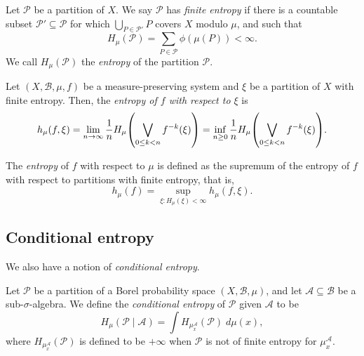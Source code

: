 \documentclass[../main]{subfiles}
\begin{document}
\begin{definition}
  Let \(\mathcal{P}\) be a partition of \(X\). We say \(\mathcal{P}\) has \emph{finite entropy} if there is a countable subset \(\mathcal{P}' \subseteq \mathcal{P}\) for which \(\bigcup_{P \in \mathcal{P}'}P\) covers \(X\) modulo \(\mu\), and such that
  \begin{equation*}
    H_{\mu}(\mathcal{P}) = \sum_{P \in \mathcal{P}} \phi(\mu(P)) < \infty.
  \end{equation*}
  We call \(H_{\mu}(\mathcal{P})\) the \emph{entropy} of the partition \(\mathcal{P}\).
\end{definition}

\begin{definition}
  Let \((X,\mathcal{B},\mu,f)\) be a measure-preserving system and \(\xi\) be a partition of \(X\) with finite entropy. Then, the \emph{entropy of \(f\) with respect to \(\xi\)} is
  \begin{equation*}
    h_{\mu}(f,\xi) =
    \lim_{n \to \infty} \frac{1}{n}H_{\mu}\rpar*{\bigvee_{0 \le k < n}f^{-k}(\xi)} = 
    \inf_{n \ge 0} \frac{1}{n}H_{\mu}\rpar*{\bigvee_{0 \le k < n}f^{-k}(\xi)}.
  \end{equation*}
\end{definition}

\begin{definition}
  The \emph{entropy} of \(f\) with respect to \(\mu\) is defined as the supremum of the entropy of \(f\) with respect to partitions with finite entropy, that is,
  \begin{equation*}
    h_{\mu}(f) = \sup_{\xi \colon H_{\mu}(\xi) < \infty}h_{\mu}(f,\xi).
  \end{equation*}
\end{definition}

\subsection{Conditional entropy}

We also have a notion of \emph{conditional entropy}.

\begin{definition}
  Let \(\mathcal{P}\) be a partition of a Borel probability space \((X,\mathcal{B},\mu)\), and let \(\mathcal{A} \subseteq \mathcal{B}\) be a sub-\(\sigma\)-algebra. We define the \emph{conditional entropy} of \(\mathcal{P}\) given \(\mathcal{A}\) to be
  \begin{equation*}
    H_{\mu}(\mathcal{P}\mid \mathcal{A}) =
    \int H_{\mu^{\mathcal{A}}_x}(\mathcal{P}) \;d\mu(x),
  \end{equation*}
  where \(H_{\mu^{\mathcal{A}}_x}(\mathcal{P})\) is defined to be \(+\infty\) when \(\mathcal{P}\) is not of finite entropy for \(\mu^{\mathcal{A}}_x\).
\end{definition}
\end{document}
